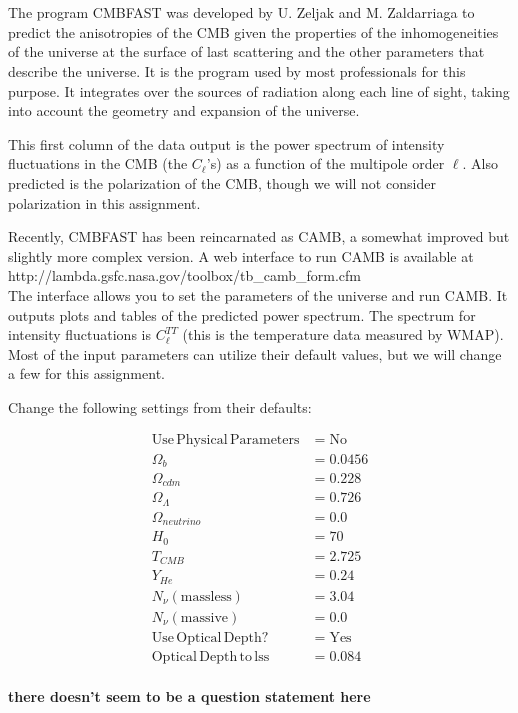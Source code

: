\documentclass[12pt]{article}
\begin{document}
\section{}

The program CMBFAST was developed by U. Zeljak and M. Zaldarriaga to predict the anisotropies of the CMB given the properties of the inhomogeneities of the universe at the surface of last scattering and the other parameters that describe the universe. It is the program used by most professionals for this purpose. It integrates over the sources of radiation along each line of sight, taking into account the geometry and expansion of the universe.

This first column of the data output is the power spectrum of intensity fluctuations in the CMB (the \(C_\ell\)'s) as a function of the multipole order \(\ell\). Also predicted is the polarization of the CMB, though we will not consider polarization in this assignment.

Recently, CMBFAST has been reincarnated as CAMB, a somewhat improved but slightly more complex version. A web interface to run CAMB is available at \\

http://lambda.gsfc.nasa.gov/toolbox/tb\_camb\_form.cfm \\

The interface allows you to set the parameters of the universe and run CAMB. It outputs plots and tables of the predicted power spectrum. The spectrum for intensity fluctuations is \(C_\ell^{TT}\) (this is the temperature data measured by WMAP). Most of the input parameters can utilize their default values, but we will change a few for this assignment.

Change the following settings from their defaults:

\begin{align*}
\mathrm{Use\,Physical\,Parameters} &= \mathrm{No} \\
\Omega_b &= 0.0456 \\
\Omega_{cdm} &= 0.228 \\
\Omega_\Lambda &= 0.726 \\
\Omega_{neutrino} &= 0.0 \\
H_0 &= 70 \\
T_{CMB} &= 2.725 \\
Y_{He}&=0.24 \\
N_\nu \mathrm{(massless)} &= 3.04 \\
N_\nu  \mathrm{(massive)} &= 0.0 \\
\mathrm{Use\,Optical\,Depth?} &= \mathrm{Yes} \\
\mathrm{Optical\,Depth\,to\,lss} &= 0.084 \\
\end{align*}

\textbf{there doesn't seem to be a question statement here}
\end{document}
